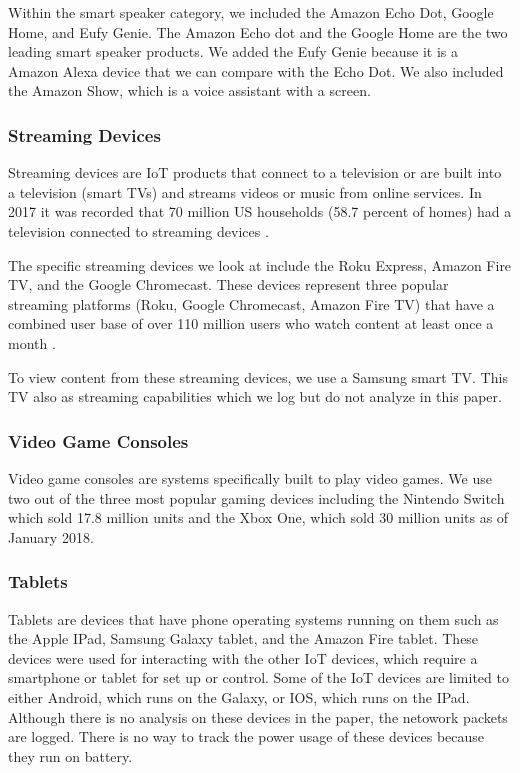Within the smart speaker category, we included the Amazon Echo Dot, Google Home, and Eufy Genie. The Amazon Echo dot and the Google Home are the two leading smart speaker products. We added the Eufy Genie because it is a Amazon Alexa device that we can compare with the Echo Dot. We also included the Amazon Show, which is a voice assistant with a screen.

\subsubsection{Streaming Devices}

Streaming devices are IoT products that connect to a television or are built into a television (smart TVs) and streams videos or music from online services. In 2017 it was recorded that 70 million US households (58.7 percent of homes) had a television connected to streaming devices \cite{lynch_2017}.

The specific streaming devices we look at include the Roku Express, Amazon Fire TV, and the Google Chromecast. These devices represent three popular streaming platforms (Roku, Google Chromecast, Amazon Fire TV) that have a combined user base of over 110 million users who watch content at least once a month \cite{emarketer_2017}.

To view content from these streaming devices, we use a Samsung smart TV. This TV also as streaming capabilities which we log but do not analyze in this paper.

\subsubsection{Video Game Consoles}

Video game consoles are systems specifically built to play video games. We use two out of the three most popular gaming devices including the Nintendo Switch which sold 17.8 million units \cite{nintendo} and the Xbox One, which sold 30 million units \cite{souppouris_2016} as of January 2018.

\subsubsection{Tablets}

Tablets are devices that have phone operating systems running on them such as the Apple IPad, Samsung Galaxy tablet, and the Amazon Fire tablet. These devices were used for interacting with the other IoT devices, which require a smartphone or tablet for set up or control. Some of the IoT devices are limited to either Android, which runs on the Galaxy, or IOS, which runs on the IPad. Although there is no analysis on these devices in the paper, the netowork packets are logged. There is no way to track the power usage of these devices because they run on battery.

